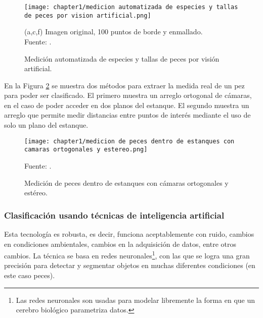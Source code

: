 \begin{figure}[H]
	\centering
	\texttt{[image: chapter1/medicion automatizada de especies y tallas de peces por vision artificial.png]}
	\caption{Medición automatizada de especies y tallas de peces por visión artificial.}
	(a,c,f) Imagen original, 100 puntos de borde y enmallado. \\
	Fuente: \cite[p.~4]{White2006}.
	\label{fig:medicion automatizada de especies y tallas de peces por vision artificial}
\end{figure}

En la Figura \ref{fig:medicion de peces dentro de estanques con camaras ortogonales y estereo} se muestra dos métodos para extraer la medida real de un pez para poder ser clasificado. El primero muestra un arreglo ortogonal de cámaras, en el caso de poder acceder en dos planos del estanque. El segundo muestra un arreglo que permite medir distancias entre puntos de interés mediante el uso de solo un plano del estanque.

\begin{figure}[H]
	\centering
	\texttt{[image: chapter1/medicion de peces dentro de estanques con camaras ortogonales y estereo.png]}
	\caption{Medición de  peces dentro de estanques con cámaras ortogonales y estéreo.}
	Fuente: \cite{Al-Jubouri2017}.
	\label{fig:medicion de peces dentro de estanques con camaras ortogonales y estereo}
\end{figure}



\subsubsection{Clasificación usando técnicas de inteligencia artificial}

Esta tecnología es robusta, es decir, funciona aceptablemente con ruido, cambios en condiciones ambientales, cambios en la adquisición de datos, entre otros cambios. La técnica se basa en redes neuronales\footnote{Las redes neuronales son usadas para modelar libremente la forma en que un cerebro biológico parametriza datos.}, con las que se logra una gran precisión para detectar y segmentar objetos en muchas diferentes condiciones (en este caso peces).\\

